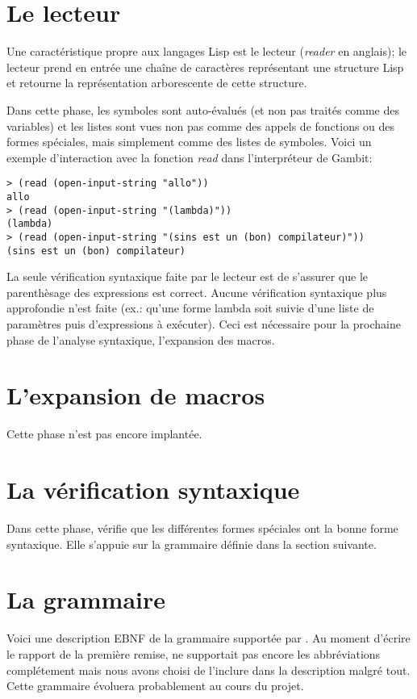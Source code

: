 \documentclass[11pt]{report}
\begin{document}
\section{Le lecteur}

Une caractéristique propre aux langages Lisp est le lecteur
(\emph{reader} en anglais); le lecteur prend en entrée une chaîne de
caractères représentant une structure Lisp et retourne la
représentation arborescente de cette structure.

Dans cette phase, les symboles sont auto-évalués (et non pas traités
comme des variables) et les listes sont vues non pas comme des appels
de fonctions ou des formes spéciales, mais simplement comme des listes
de symboles.  Voici un exemple d'interaction avec la fonction
\emph{read} dans l'interpréteur de Gambit:

\begin{verbatim}
> (read (open-input-string "allo"))
allo
> (read (open-input-string "(lambda)"))
(lambda)
> (read (open-input-string "(sins est un (bon) compilateur)"))
(sins est un (bon) compilateur)
\end{verbatim}

La seule vérification syntaxique faite par le lecteur est de s'assurer
que le parenthèsage des expressions est correct.  Aucune vérification
syntaxique plus approfondie n'est faite (ex.: qu'une forme lambda soit
suivie d'une liste de paramètres puis d'expressions à exécuter).  Ceci
est nécessaire pour la prochaine phase de l'analyse syntaxique,
l'expansion des macros.


\section{L'expansion de macros}

Cette phase n'est pas encore implantée.


\section{La vérification syntaxique}

Dans cette phase, \sins{} vérifie que les différentes formes spéciales
ont la bonne forme syntaxique.  Elle s'appuie sur la grammaire définie
dans la section suivante.

\section{La grammaire}
Voici une description EBNF de la grammaire supportée par \sins{}. Au moment d'écrire le rapport de la première remise, \sins{} ne supportait pas encore les abbréviations complétement mais nous avons choisi de l'inclure dans la description malgré tout. Cette grammaire évoluera probablement au cours du projet.
\end{document}
